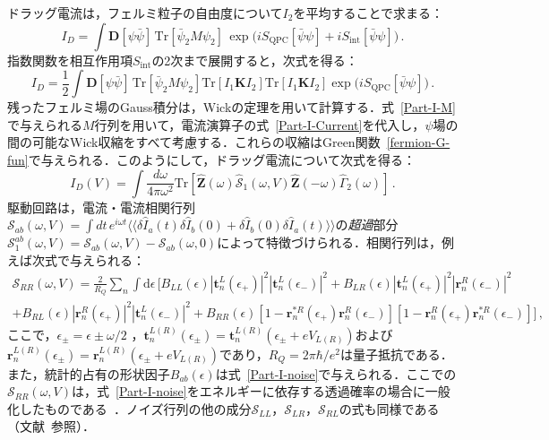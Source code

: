 \documentclass[a4paper,11pt]{ltjsarticle}
\def\d{\mathrm{d}}
\begin{document}
ドラッグ電流は，フェルミ粒子の自由度について$I_{2}$を平均することで求まる：
\begin{equation}\label{Part-I-ID-def}
I_{D}=
\int\mathbf{D}[\psi\bar{\psi}]\,\mathrm{Tr}\left[\bar{\psi}_{2}M\psi_{2}\right]\,
\exp\big(iS_{\mathrm{QPC}}[\bar{\psi}\psi]+iS_{\mathrm{int}}[\bar{\psi}\psi]\big)\,.
\end{equation}
指数関数を相互作用項$S_{\mathrm{int}}$の2次まで展開すると，次式を得る：
\begin{equation}\label{Part-I-ID-def-perturb}
I_{D}=\frac{1}{2}\int\mathbf{D}[\psi\bar{\psi}]\,
\mathrm{Tr}\left[\bar{\psi}_{2}M\psi_{2}\right]
\mathrm{Tr}\left[I_{1}\mathbf{K}I_{2}\right]
\mathrm{Tr}\left[I_{1}\mathbf{K}I_{2}\right]
\exp\big(iS_{\mathrm{QPC}}[\bar{\psi}\psi]\big)\,.
\end{equation}
残ったフェルミ場のGauss積分は，Wickの定理を用いて計算する．式~\eqref{Part-I-M}で与えられる$M$行列を用いて，電流演算子の式~\eqref{Part-I-Current}を代入し，$\psi$場の間の可能なWick収縮をすべて考慮する．これらの収縮はGreen関数~\eqref{fermion-G-fun}で与えられる．このようにして，ドラッグ電流について次式を得る：
\begin{equation}\label{Part-I-ID-result}
I_D(V)=
\int\frac{d\omega}{4\pi\omega^{2}}\mathrm{Tr}\left[\hat{\mathbf{Z}}(\omega)
\hat{\mathcal{S}}_{1}(\omega,V)\hat{\mathbf{Z}}(-\omega)
\hat{\Gamma}_{2}(\omega)\right]\,.
\end{equation}
駆動回路は，電流・電流相関行列$\mathcal{S}_{ab}(\omega,V)=\int dt\, e^{i\omega
t}\big\langle\big\langle\delta\hat{I}_{a}(t)\delta\hat{I}_{b}(0)+
\delta\hat{I}_{b}(0)\delta\hat{I}_{a}(t)\big\rangle\big\rangle$の{\em 超過}部分$\mathcal{S}^{ab}_{1}(\omega,V)=\mathcal{S}_{ab}(\omega,V)-\mathcal{S}_{ab}(\omega,0)$によって特徴づけられる．相関行列は，例えば次式で与えられる：
\begin{eqnarray}\label{Part-I-noise-Srr}
\mathcal{S}_{RR}(\omega,V)=\frac{2}{R_{Q}}\sum_{n}\int\d\epsilon\,
\big[B_{LL}(\epsilon)|\mathbf{t}^{L}_{n}(\epsilon_{+})|^{2}
|\mathbf{t}^{L}_{n}(\epsilon_{-})|^{2}+B_{LR}(\epsilon)
|\mathbf{t}^{L}_{n}(\epsilon_{+})|^{2}|\mathbf{r}^{R}_{n}(\epsilon_{-})|^{2}\nonumber\\
+B_{RL}(\epsilon)|\mathbf{r}^{R}_{n}(\epsilon_{+})|^{2}
|\mathbf{t}^{L}_{n}(\epsilon_{-})|^{2}+B_{RR}(\epsilon)
[1-\mathbf{r}^{*R}_{n}(\epsilon_{+})\mathbf{r}^{R}_{n}(\epsilon_{-})]
[1-\mathbf{r}^{R}_{n}(\epsilon_{+})\mathbf{r}^{*R}_{n}(\epsilon_{-})]\big]\,,
\end{eqnarray}
ここで，$\epsilon_\pm = \epsilon \pm \omega/2\,\,$，$\mathbf{t}^{L(R)}_{n}(\epsilon_\pm)=\mathbf{t}^{L(R)}_{n}(\epsilon_\pm+eV_{L(R)})$および$\mathbf{r}^{L(R)}_{n}(\epsilon_\pm)=\mathbf{r}^{L(R)}_{n}(\epsilon_\pm+eV_{L(R)})$であり，$R_{Q}=2\pi\hbar/e^2$は量子抵抗である．また，統計的占有の形状因子$B_{ab}(\epsilon)$は式~\eqref{Part-I-noise}で与えられる．ここでの$\mathcal{S}_{RR}(\omega,V)$は，式~\eqref{Part-I-noise}をエネルギーに依存する透過確率の場合に一般化したものである~\cite{Buttiker}．ノイズ行列の他の成分$\mathcal{S}_{LL}$，$\mathcal{S}_{LR}$，$\mathcal{S}_{RL}$の式も同様である（文献~\cite{Buttiker,LevchenkoKamenev-QPC}参照）．
\end{document}
